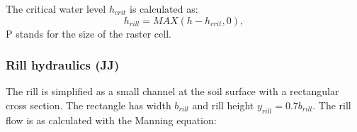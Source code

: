             The critical water level $h_{crit}$ is calculated as:
            \begin{equation}
              h_{rill} = MAX(h-h_{crit},0),
              \label{eq:hrill}
            \end{equation}
            P stands for the size of the raster cell. 

        \subsubsection{Rill hydraulics (JJ)}

            The rill is simplified as a small channel at the soil surface with
            a rectangular cross section. The rectangle has width $b_{rill}$ and
            rill height $y_{rill} = 0.7b_{rill}$. The rill flow is as
            calculated with the Manning equation: 

